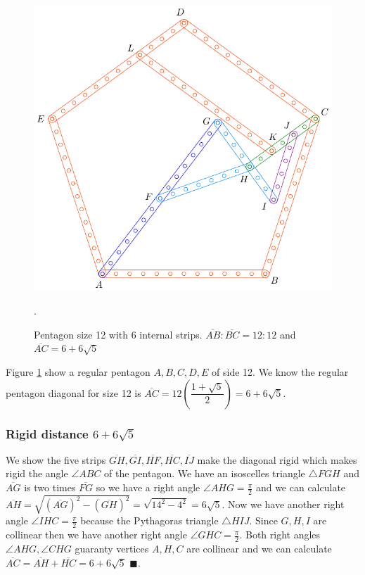 \documentclass[11pt]{article}
\begin{document}
\begin{figure}[h]
 \centering
 \includegraphics[scale=0.8]{12/penta12-6a}
 \caption{Pentagon size 12 with 6 internal strips. $\overline{AB}:\overline{BC} = 12:12$ and $\overline{AC} = 6 + 6\sqrt5$}.
 \label{fig:penta12-6a}
\end{figure}

Figure \ref{fig:penta12-6a} show a regular pentagon $A,B,C,D,E$ of side 12. We know the regular pentagon diagonal for size 12 is $\overline{AC} = 12\left(\dfrac{1+\sqrt5}2\right) = 6 + 6\sqrt5$. 

\subsubsection{Rigid distance $6 + 6\sqrt5$}

We show the five strips $\overline{GH},\overline{GI},\overline{HF},\overline{HC},\overline{IJ}$ make the diagonal rigid which makes rigid the angle $\angle{ABC}$ of the pentagon. We have an isoscelles triangle $\triangle{FGH}$ and $\overline{AG}$ is two times $\overline{FG}$ so we have a right angle $\angle{AHG} = \frac{\pi}2$ and we can calculate $\overline{AH} = \sqrt{(\overline{AG})^2 - (\overline{GH})^2} = \sqrt{14^2-4^2} = 6\sqrt5$. Now we have another right angle $\angle{IHC} = \frac{\pi}2$ because the Pythagoras triangle $\triangle{HIJ}$. Since $G,H,I$ are collinear then we have another right angle $\angle{GHC}=\frac{\pi}2$. Both right angles $\angle{AHG},\angle{CHG}$ guaranty vertices $A,H,C$ are collinear and we can calculate $\overline{AC} = \overline{AH} + \overline{HC} = 6 + 6\sqrt5$ $\blacksquare$.
\end{document}
